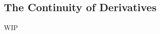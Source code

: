 \documentclass[../poma-notes.tex]{subfiles}
\begin{document}
\subsection*{The Continuity of Derivatives}

WIP
\end{document}
